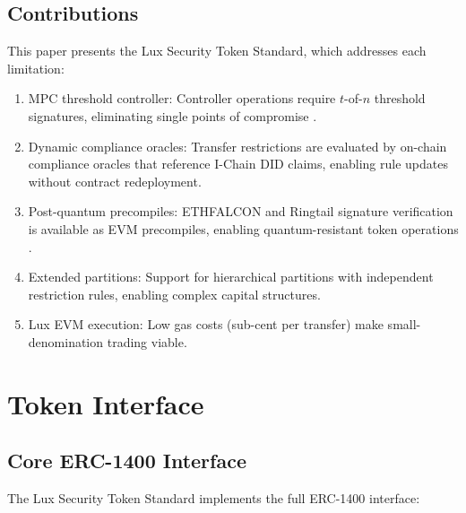 \documentclass[11pt,a4paper]{article}
\begin{document}
\subsection{Contributions}

This paper presents the Lux Security Token Standard, which addresses each limitation:

\begin{enumerate}[nosep]
  \item MPC threshold controller: Controller operations require $t$-of-$n$ threshold signatures, eliminating single points of compromise \cite{lux-mchain-mpc, lux-ats-architecture}.
  \item Dynamic compliance oracles: Transfer restrictions are evaluated by on-chain compliance oracles that reference I-Chain DID claims, enabling rule updates without contract redeployment.
  \item Post-quantum precompiles: ETHFALCON and Ringtail signature verification is available as EVM precompiles, enabling quantum-resistant token operations \cite{lux-ethfalcon-pq}.
  \item Extended partitions: Support for hierarchical partitions with independent restriction rules, enabling complex capital structures.
  \item Lux EVM execution: Low gas costs (sub-cent per transfer) make small-denomination trading viable.
\end{enumerate}

\section{Token Interface}\label{sec:interface}

\subsection{Core ERC-1400 Interface}

The Lux Security Token Standard implements the full ERC-1400 interface:
\end{document}

